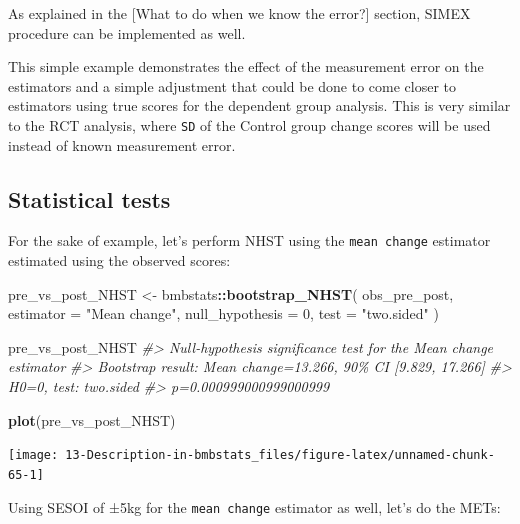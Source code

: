\documentclass[
]{book}
\newenvironment{Shaded}{\begin{snugshade}}{\end{snugshade}}
\newcommand{\CommentTok}[1]{\textcolor[rgb]{0.56,0.35,0.01}{\textit{#1}}}
\newcommand{\DataTypeTok}[1]{\textcolor[rgb]{0.13,0.29,0.53}{#1}}
\newcommand{\DecValTok}[1]{\textcolor[rgb]{0.00,0.00,0.81}{#1}}
\newcommand{\KeywordTok}[1]{\textcolor[rgb]{0.13,0.29,0.53}{\textbf{#1}}}
\newcommand{\NormalTok}[1]{#1}
\newcommand{\OperatorTok}[1]{\textcolor[rgb]{0.81,0.36,0.00}{\textbf{#1}}}
\newcommand{\StringTok}[1]{\textcolor[rgb]{0.31,0.60,0.02}{#1}}
\begin{document}
As explained in the {[}What to do when we know the error?{]} section, SIMEX procedure can be implemented as well.

This simple example demonstrates the effect of the measurement error on the estimators and a simple adjustment that could be done to come closer to estimators using true scores for the dependent group analysis. This is very similar to the RCT analysis, where \texttt{SD} of the Control group change scores will be used instead of known measurement error.

\hypertarget{statistical-tests}{%
\subsection{Statistical tests}\label{statistical-tests}}

For the sake of example, let's perform NHST using the \texttt{mean\ change} estimator estimated using the observed scores:

\begin{Shaded}
\begin{Highlighting}[]
\NormalTok{pre\_vs\_post\_NHST <{-}}\StringTok{ }\NormalTok{bmbstats}\OperatorTok{::}\KeywordTok{bootstrap\_NHST}\NormalTok{(}
\NormalTok{  obs\_pre\_post,}
  \DataTypeTok{estimator =} \StringTok{"Mean change"}\NormalTok{,}
  \DataTypeTok{null\_hypothesis =} \DecValTok{0}\NormalTok{,}
  \DataTypeTok{test =} \StringTok{"two.sided"}
\NormalTok{)}

\NormalTok{pre\_vs\_post\_NHST}
\CommentTok{\#> Null{-}hypothesis significance test for the \textasciigrave{}Mean change\textasciigrave{} estimator}
\CommentTok{\#> Bootstrap result: Mean change=13.266, 90\% CI [9.829, 17.266]}
\CommentTok{\#> H0=0, test: two.sided}
\CommentTok{\#> p=0.000999000999000999}
\end{Highlighting}
\end{Shaded}

\begin{Shaded}
\begin{Highlighting}[]
\KeywordTok{plot}\NormalTok{(pre\_vs\_post\_NHST)}
\end{Highlighting}
\end{Shaded}

\begin{center}\texttt{[image: 13-Description-in-bmbstats\_files/figure-latex/unnamed-chunk-65-1]} \end{center}

Using SESOI of ±5kg for the \texttt{mean\ change} estimator as well, let's do the METs:
\end{document}
